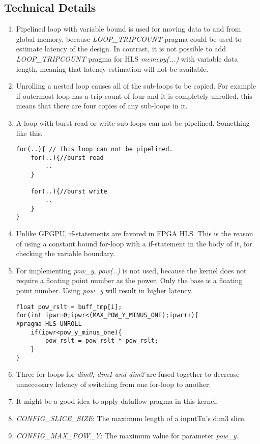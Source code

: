 \subsection{Technical Details}
\begin{enumerate}
\item Pipelined loop with variable bound is used for moving data to and from global memory, because \emph{LOOP\_TRIPCOUNT} pragma could be used to estimate latency of the design. In contrast, it is not possible to add \emph{LOOP\_TRIPCOUNT} pragma for HLS \emph{memcpy(...)} with variable data length, meaning that latency estimation will not be available.

\item Unrolling a nested loop causes all of the sub-loops to be copied. For example if outermost loop has a trip count of four and it is completely unrolled, this means that there are four copies of any sub-loops in it.

\item A loop with burst read or write sub-loops can not be pipelined. Something like this.
\begin{lstlisting}
for(..){ // This loop can not be pipelined.
	for(..){//burst read
		..
	}
	
	for(..){//burst write
		..
	}
}
\end{lstlisting}

\item Unlike GPGPU, if-statements are favored in FPGA HLS. This is the reason of using a constant bound for-loop with a if-statement in the body of it, for checking the variable boundary.

\item For implementing \emph{pow\_y}, \emph{pow(..)} is not used, because the kernel does not require a floating point number as the power. Only the base is a floating point number. Using \emph{pow\_y} will result in higher latency.
\begin{lstlisting}
float pow_rslt = buff_tmp[i];
for(int ipwr=0;ipwr<(MAX_POW_Y_MINUS_ONE);ipwr++){
#pragma HLS UNROLL
	if(ipwr<pow_y_minus_one){
		pow_rslt = pow_rslt * pow_rslt;
	}
}
\end{lstlisting}

\item Three for-loops for \emph{dim0, dim1 and dim2} are fused together to decrease unnecessary latency of switching from one for-loop to another.

\item It might be a good idea to apply dataflow pragma in this kernel.

\item \emph{CONFIG\_SLICE\_SIZE}: The maximum length of a inputTn's dim3 slice.

\item \emph{CONFIG\_MAX\_POW\_Y}: The maximum value for parameter \emph{pow\_y}.
\end{enumerate}




